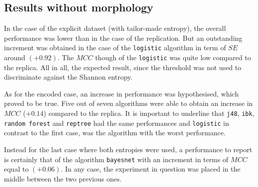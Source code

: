 \subsection{Results without morphology}
In the case of the explicit dataset (with tailor-made entropy), the overall performance was lower than in the case of the replication. But an outstanding increment was obtained in the case of the \verb|logistic| algorithm in term of $SE$ around $(+0.92)$. The $MCC$ though of the \verb|logistic| was quite low compared to the replica. All in all, the expected result, since the threshold was not used to discriminate against the Shannon entropy. 

As for the encoded case, an increase in performance was hypothesised, which proved to be true. Five out of seven algorithms were able to obtain an increase in $MCC$ ($+0.14$) compared to the replica. It is important to underline that \verb|j48|, \verb|ibk|, \verb|random forest| and \verb|reptree| had the same performances and \verb|logistic| in contrast to the first case, was the algorithm with the worst performance.

Instead for the last case where both entropies were used, a performance to report is certainly that of the algorithm \verb|bayesnet| with an increment in terms of $MCC$ equal to $(+0.06)$. In any case, the experiment in question was placed in the middle between the two previous ones.


